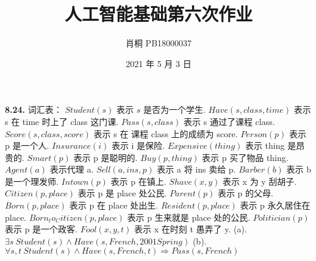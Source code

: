 \documentclass[UTF8]{ctexart}
\begin{document}
    \title{人工智能基础第六次作业}
    \author{肖桐 PB18000037}
    \date{2021 年 5 月 3 日}
    \maketitle

    \textnormal{\textbf{8.24.}}\newline
    词汇表：\newline
    $Student(s)$ 表示 $s$ 是否为一个学生.\newline
    $Have(s, class, time)$ 表示 s 在 time 时上了 class 这门课.\newline
    $Pass(s, class)$ 表示 s 通过了课程 class.\newline
    $Score(s, class, score)$ 表示 s 在 课程 class 上的成绩为 score.\newline
    $Person(p)$ 表示 p 是一个人.\newline
    $Insurance(i)$ 表示 i 是保险.\newline
    $Expensive(thing)$ 表示 thing 是昂贵的.\newline
    $Smart(p)$ 表示 p 是聪明的.\newline
    $Buy(p, thing)$ 表示 p 买了物品 thing.\newline
    $Agent(a)$ 表示代理 a.\newline
    $Sell(a, ins, p)$ 表示 a 将 ins 卖给 p.\newline
    $Barber(b)$ 表示 b 是一个理发师.\newline
    $Intown(p)$ 表示 p 在镇上.\newline
    $Shave(x, y)$ 表示 x 为 y 刮胡子.\newline
    $Citizen(p, place)$ 表示 p 是 place 处公民.\newline
    $Parent(p)$ 表示 p 的父母.\newline
    $Born(p, place)$ 表示 p 在 place 处出生.\newline
    $Resident(p, place)$ 表示 p 永久居住在 place.\newline
    $Born_to_Citizen(p, place)$ 表示 p 生来就是 place 处的公民.\newline
    $Politician(p)$ 表示 p 是一个政客.\newline
    $Fool(x, y, t)$ 表示 x 在时刻 t 愚弄了 y.\newline
    (a). $\exists s\ Student(s) \wedge Have(s, French, 2001 Spring)$\newline
    (b). $\forall s, t\ Student(s) \wedge Have(s, French, t) \Rightarrow Pass(s, French)$\newline
\end{document}
